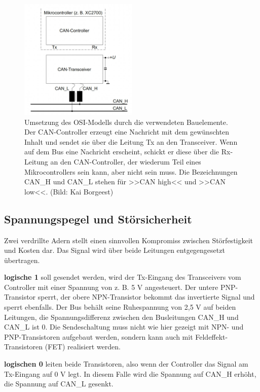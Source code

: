 \begin{figure}[!ht]%
\centering
\includegraphics[width=0.5\textwidth]{images/CAN/CAN-5.pdf}
\caption{Umsetzung des OSI-Modells durch die verwendeten Bauelemente.
Der CAN-Controller erzeugt eine Nachricht mit dem gewünschten Inhalt und
sendet sie über die Leitung Tx an den Transceiver. Wenn auf dem Bus eine
Nachricht erscheint, schickt er diese über die Rx-Leitung an den
CAN-Controller, der wiederum Teil eines Mikrocontrollers sein kann, aber
nicht sein muss. Die Bezeichnungen CAN\_H und CAN\_L stehen für >>CAN
high<< und >>CAN low<<. (Bild: Kai Borgeest)}
\end{figure}

\newpage

\subsection{Spannungspegel und
Störsicherheit}\label{spannungspegel-und-stoersicherheit}

Zwei verdrillte Adern stellt einen sinnvollen Kompromiss zwischen
Störfestigkeit und Kosten dar. Das Signal wird über beide Leitungen
entgegengesetzt übertragen.

\textbf{logische 1} soll gesendet werden, wird der Tx-Eingang des
Transceivers vom Controller mit einer Spannung von z. B. 5 V
angesteuert. Der untere PNP-Transistor sperrt, der obere NPN-Transistor
bekommt das invertierte Signal und sperrt ebenfalls. Der Bus behält
seine Ruhespannung von 2,5 V auf beiden Leitungen, die
Spannungsdifferenz zwischen den Busleitungen CAN\_H und CAN\_L ist 0.
Die Sendeschaltung muss nicht wie hier gezeigt mit NPN- und
PNP-Transistoren aufgebaut werden, sondern kann auch mit
Feldeffekt-Transistoren (FET) realisiert werden.

\textbf{logischen 0} leiten beide Transistoren, also wenn der Controller
das Signal am Tx-Eingang auf 0 V legt. In diesem Falle wird die Spannung
auf CAN\_H erhöht, die Spannung auf CAN\_L gesenkt.

